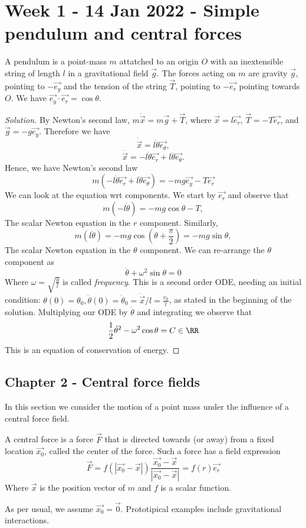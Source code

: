 \section{Week 1 - 14 Jan 2022 - Simple pendulum and central forces}
\begin{example}
  A pendulum is a point-mass $m$ attatched to an origin $O$ with an inextensible
  string of length $l$ in a gravitational field $\vec{g}$. The forces acting on
  $m$ are gravity $\vec{g}$, pointing to $-\vec{e_y}$  and the tension of the
  string $\vec{T}$, pointing to $-\vec{e_r}$ pointing towards $O$. We have
  $\vec{e_y}\cdot \vec{e_r}=\cos\theta$.
\end{example}
\begin{proof}[Solution]
  By Newton's second law, $m\ddot{\vec{x}}= m\vec{g} + \vec{T}$, where
  $\vec{x}=l\vec{e_r}$, $\vec{T}=-T\vec{e_r}$, and $\vec{g}=-g\vec{e_y}$.
  Therefore we have 
  \[\dot{\vec{x}} = l\dot{\theta}\vec{e_{\theta}}, \]
  \[\ddot{\vec{x}} = -l\dot{\theta}\vec{e_r} + l\ddot{\theta}\vec{e_{\theta}}.\]
  Hence, we have Newton's second law
  \[m(-l\dot{\theta}\vec{e_r} + l\ddot{\theta}\vec{e_{\theta}}) = -mg\vec{e_y}
  -T\vec{e_r}\]
  We can look at the equation wrt components. We start by $\vec{e_r}$ and
  observe that 
  \[m(-l\dot{\theta}) =-mg\cos\theta - T,\]
  The scalar Newton equation in the $r$ component. Similarly,
  \[m(l\ddot{\theta}) = -mg\cos(\theta+\frac{\pi}{2}) = -mg\sin\theta,\]
  The scalar Newton equation in the $\theta$ component. We can re-arrange the
  $\theta$ component as 
  \[\ddot{\theta} + \omega^2\sin\theta = 0\]
  Where $\omega=\sqrt{\frac{g}{l}}$ is called \emph{frequency}. This is a second
  order ODE, needing an initial condition: $\theta(0)=\theta_0,
  \dot{\theta}(0)=\dot{\theta}_0=\dot{\vec{x}}/l=\frac{v_0}{l}$, as stated in
  the beginning of the solution. Multiplying our ODE by $\dot{\theta}$ and
  integrating we observe that 
  \[\frac{1}{2}\dot{\theta}^2-\omega^2\cos\theta = C\in\RR\]
  This is an equation of conservation of energy.
\end{proof}

\subsection{Chapter 2 - Central force fields}
In this section we consider the motion of a point mass under the influence of a
central force field.
\begin{definition}
  A central force is a force $\vec{F}$ that is directed towards (or away) from a fixed
  location $\vec{x_0}$, called the center of the force. Such a force has a field
  expression 
  \[\vec{F}= f(|\vec{x_0}-\vec{x}|)
  \frac{\vec{x_0}-\vec{x}}{|\vec{x_0}-\vec{x}|}=f(r)\vec{e_r}\]
  Where $\vec{x}$ is the position vector of $m$ and $f$ is a scalar function.
\end{definition}
As per usual, we assume $\vec{x_0}=\vec{0}$.
Prototipical examples include gravitational interactions.

